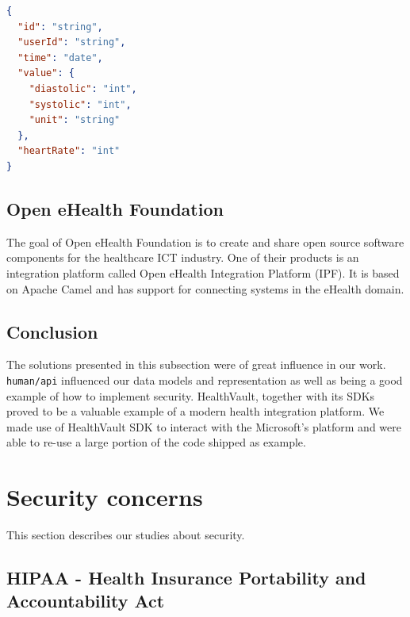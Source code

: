 \begin{lstlisting}[language=JSON]
{
  "id": "string",
  "userId": "string",
  "time": "date",
  "value": {
    "diastolic": "int",
    "systolic": "int",
    "unit": "string"
  },
  "heartRate": "int"
}
\end{lstlisting}




\subsection{Open eHealth Foundation}

The goal of Open eHealth Foundation is to create and share open source software components for the healthcare ICT industry.
One of their products is an integration platform called Open eHealth Integration Platform (IPF).
It is based on Apache Camel and has support for connecting systems in the eHealth domain. \cite{OpenEHealthFoundation}


\subsection{Conclusion}

The solutions presented in this subsection were of great influence in our work.
\verb|human/api| influenced our data models and representation as well as being a good example of how to implement security.
HealthVault, together with its SDKs proved to be a valuable example of a modern health integration platform.
We made use of HealthVault SDK to interact with the Microsoft's platform and were able to re-use a large portion of the code shipped as example.



\section{Security concerns}

This section describes our studies about security.

\subsection{HIPAA - Health Insurance Portability and Accountability Act}


